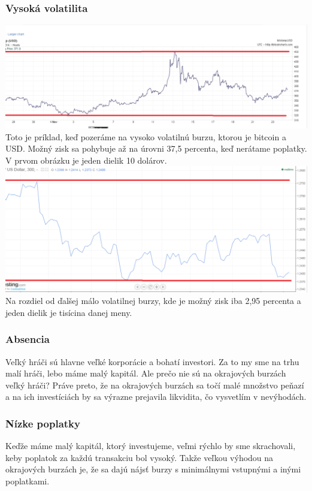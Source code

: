 \subsubsection{Vysoká volatilita}
\includegraphics[width=1\textwidth]{obr}
Toto je príklad, keď pozeráme na vysoko volatilnú burzu, ktorou je bitcoin a USD. Možný zisk sa pohybuje až na úrovni 37,5 percenta, keď nerátame poplatky. V prvom obrázku je jeden dielik 10 dolárov. 
\\
\includegraphics[width=1\textwidth]{obr2}
Na rozdiel od ďalšej málo volatilnej burzy, kde je  možný zisk iba 2,95 percenta a jeden dielik je tisícina danej meny.
\subsubsection{Absencia }
Veľký hráči\cite{ZAC} sú hlavne veľké korporácie a bohatí investori. Za to my sme na trhu malí hráči, lebo máme malý kapitál. Ale prečo nie sú na okrajových burzách veľký hráči? Práve preto, že na okrajových burzách sa točí malé množstvo peňazí a na ich investíciách by sa výrazne prejavila likvidita, čo vysvetlím v nevýhodách.
\subsubsection{Nízke poplatky}
Keďže máme malý kapitál, ktorý investujeme, veľmi rýchlo by sme skrachovali, keby poplatok za každú transakciu  bol vysoký. Takže veľkou výhodou na okrajových burzách je, že sa dajú nájsť burzy s minimálnymi vstupnými a inými poplatkami.
